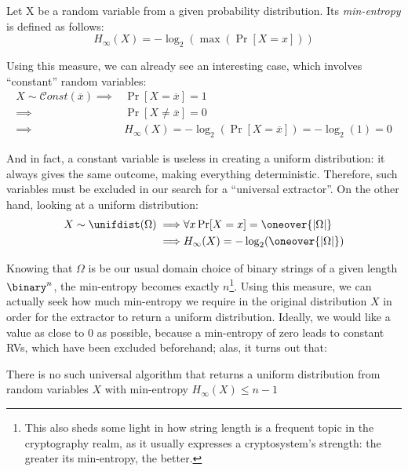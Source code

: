\begin{definition} Let X be a random variable from a given probability distribution. Its \emph{min-entropy} is defined as follows:
    \[
        H_{\infty}(X) = -\log_2(\max(\Pr[X = x]))
    \]
\end{definition}

Using this measure, we can already see an interesting case, which involves ``constant'' random variables:
\begin{align*}
    X \sim \mathcal{C}onst(\overline{x}) \implies& \Pr[X = \overline{x}] = 1 \\
    \implies& \Pr[X \neq \overline{x}] = 0 \\
    \implies& H_{\infty}(X) = -\log_2(\Pr[X = \overline{x}]) = -\log_2(1) = 0
\end{align*}

And in fact, a constant variable is useless in creating a uniform distribution: it always gives the same outcome, making everything deterministic. Therefore, such variables must be excluded in our search for a ``universal extractor''.
On the other hand, looking at a uniform distribution:
\begin{align*}
    X \sim \unifdist(\Omega) \implies& \forall x \Pr[X = x] = \oneover{|\Omega|} \\
    \implies& H_{\infty}(X) = -\log_2(\oneover{|\Omega|})
\end{align*}

Knowing that $\Omega$ is be our usual domain choice of binary strings of a given length $\binary^n$, the min-entropy becomes exactly $n$\footnote{This also sheds some light in how string length is a frequent topic in the cryptography realm, as it usually expresses a cryptosystem's strength: the greater its min-entropy, the better.}.
Using this measure, we can actually seek how much min-entropy we require in the original distribution $X$ in order for the extractor to return a uniform distribution. Ideally, we would like a value as close to 0 as possible, because a min-entropy of zero leads to constant RVs, which have been excluded beforehand; alas, it turns out that:
\begin{claim}
    There is no such universal \ext{} algorithm that returns a uniform distribution from random variables $X$ with min-entropy $H_{\infty}(X) \leq n - 1$
\end{claim}

